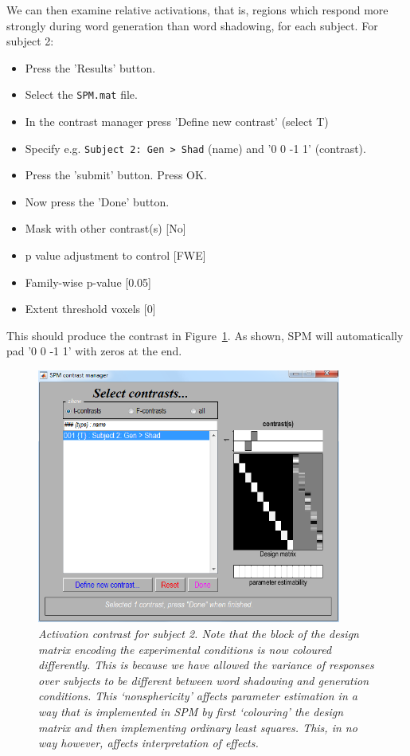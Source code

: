We can then examine relative activations, that is, regions which respond more strongly during word generation than word shadowing, for each subject. For subject 2:
\begin{itemize}
\item{Press the 'Results' button.}
\item{Select the \texttt{SPM.mat} file.}
\item{In the contrast manager press 'Define new contrast' (select T)}
\item{Specify e.g. \verb!Subject 2: Gen > Shad! (name) and '0 0 -1 1' (contrast).}
\item{Press the 'submit' button. Press OK.}
\item{Now press the 'Done' button.}
\item{Mask with other contrast(s) [No]}
\item{p value adjustment to control [FWE]}
\item{Family-wise p-value [0.05]}
\item{Extent threshold {voxels} [0]}
\end{itemize}
This should produce the contrast in Figure~\ref{subject2}. As shown, SPM will automatically pad '0 0 -1 1' with zeros
at the end.
\begin{figure}
\begin{center}
\includegraphics[width=100mm]{pet/subject2}
\caption{\em Activation contrast for subject 2. Note that the block of the design matrix encoding the experimental conditions is now coloured differently. This is because we have allowed the variance of responses over subjects to be different between word shadowing and generation conditions. This `nonsphericity' affects parameter estimation in a way that is implemented in SPM by first `colouring' the design matrix and then implementing ordinary least squares. This, in no way however, affects interpretation of effects.  \label{subject2}}
\end{center}
\end{figure}
